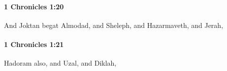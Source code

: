 		\paragraph{1 Chronicles 1:20} %
			\label{1CHRONICLES-1-20}

			And Joktan begat Almodad, and Sheleph, and Hazarmaveth, and Jerah,


		\paragraph{1 Chronicles 1:21} %
			\label{1CHRONICLES-1-21}

			Hadoram also, and Uzal, and Diklah,


